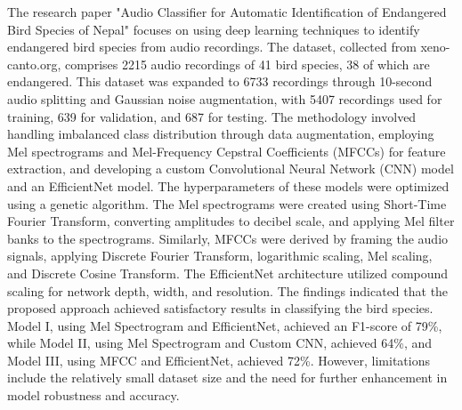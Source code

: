 The research paper "Audio Classifier for Automatic Identification of Endangered Bird Species
of Nepal" focuses on using deep learning techniques to identify endangered bird species from 
audio recordings. The dataset, collected from xeno-canto.org, comprises 2215 audio recordings 
of 41 bird species, 38 of which are endangered. This dataset was expanded to 6733 recordings 
through 10-second audio splitting and Gaussian noise augmentation, with 5407 recordings used for 
training, 639 for validation, and 687 for testing. The methodology involved handling imbalanced 
class distribution through data augmentation, employing Mel spectrograms and Mel-Frequency Cepstral 
Coefficients (MFCCs) for feature extraction, and developing a custom Convolutional Neural Network (CNN) 
model and an EfficientNet model. The hyperparameters of these models were optimized using a genetic
 algorithm. The Mel spectrograms were created using Short-Time Fourier Transform, converting amplitudes 
 to decibel scale, and applying Mel filter banks to the spectrograms. Similarly, MFCCs were derived by 
 framing the audio signals, applying Discrete Fourier Transform, logarithmic scaling, Mel scaling, and 
 Discrete Cosine Transform. The EfficientNet architecture utilized compound scaling for network depth, 
 width, and resolution. The findings indicated that the proposed approach achieved satisfactory results 
 in classifying the bird species. Model I, using Mel Spectrogram and EfficientNet, achieved an F1-score of 
 79\%, while Model II, using Mel Spectrogram and Custom CNN, achieved 64\%, and Model III, using MFCC and 
 EfficientNet, achieved 72\%. However, limitations include the relatively small dataset size and the need 
 for further enhancement in model robustness and accuracy. \cite{gautam2023audio}

